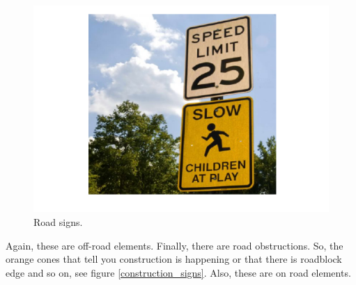 \begin{figure}[!htb]
\begin{center}
\includegraphics[scale=0.280]{img/intro_self_driving/road_signs.jpeg}
\end{center}
\caption{Road signs.}
\label{road_signs}
\end{figure}

Again, these are off-road elements. Finally, there are road obstructions. So, the orange cones that tell you construction is happening or that there is roadblock edge and so on, see figure \ref{construction_signs}. Also, these are on road elements. 


